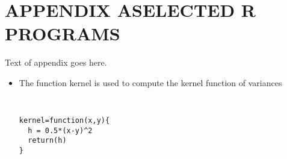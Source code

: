 \chapter{\texorpdfstring{APPENDIX A\hspace{1em}SELECTED R PROGRAMS}{APPENDIX A}}

Text of appendix goes here.

\begin{itemize}
\item The function kernel is used to compute the kernel function of variances
{\small \tt
\begin{verbatim}
kernel=function(x,y){
  h = 0.5*(x-y)^2
  return(h)
}
\end{verbatim}
}
\end{itemize}
